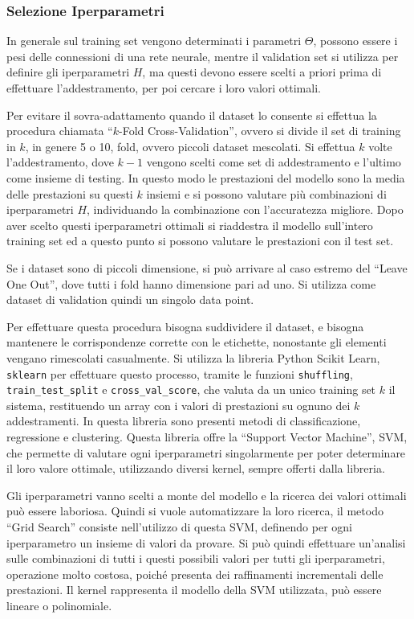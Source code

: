 \documentclass{article}
\numberwithin{equation}{subsection}
\begin{document}
\subsubsection{Selezione Iperparametri}

In generale sul training set vengono determinati i parametri $\Theta$, possono essere i pesi delle connessioni di una rete neurale, mentre il validation set si utilizza per definire 
gli iperparametri $H$, ma questi devono essere scelti a priori prima di effettuare l'addestramento, per poi cercare i loro valori ottimali. 

Per evitare il sovra-adattamento quando il dataset lo consente si effettua la procedura chiamata ``$k$-Fold Cross-Validation'', ovvero si divide il set di training in $k$, in genere 5 o 10, fold, ovvero piccoli dataset mescolati. Si effettua $k$ volte l'addestramento, dove $k-1$ vengono scelti come set di addestramento e l'ultimo come insieme di testing. In questo modo le prestazioni del modello sono la media delle prestazioni su questi $k$ insiemi e si possono 
valutare più combinazioni di iperparametri $H$, individuando la combinazione con l'accuratezza migliore. Dopo aver scelto questi iperparametri ottimali si riaddestra il modello sull'intero training set ed a questo punto si possono valutare le prestazioni con il test set. 

Se i dataset sono di piccoli dimensione, si può arrivare al caso estremo del ``Leave One Out'', dove tutti i fold hanno dimensione pari ad uno. Si utilizza come dataset di validation quindi un singolo data point. 

Per effettuare questa procedura bisogna suddividere il dataset, e bisogna mantenere le corrispondenze corrette con le etichette, nonostante gli elementi vengano rimescolati casualmente. 
Si utilizza la libreria Python Scikit Learn, \verb|sklearn| per effettuare questo processo, tramite le funzioni \verb|shuffling|, \verb|train_test_split| e \verb|cross_val_score|, che valuta da un unico training set $k$ il sistema, restituendo un array con i valori di prestazioni su ognuno dei $k$ addestramenti. 
In questa libreria sono presenti metodi di classificazione, regressione e clustering. 
Questa libreria offre la ``Support Vector Machine'', SVM, che permette di valutare ogni iperparametri singolarmente per poter determinare il loro valore ottimale, utilizzando diversi kernel, sempre offerti dalla libreria. 

Gli iperparametri vanno scelti a monte del modello e la ricerca dei valori ottimali può essere laboriosa. Quindi si vuole automatizzare la loro ricerca, il metodo ``Grid Search'' 
consiste nell'utilizzo di questa SVM, definendo per ogni iperparametro un insieme di valori da provare. Si può quindi effettuare un'analisi sulle combinazioni di tutti i questi possibili valori per tutti gli iperparametri, operazione molto costosa, poiché presenta dei raffinamenti incrementali delle prestazioni. 
Il kernel rappresenta il modello della SVM utilizzata, può essere lineare o polinomiale. 
\end{document}
